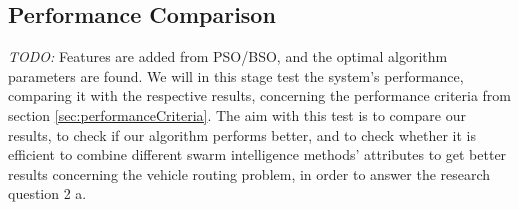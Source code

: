 \subsection{Performance Comparison}
\emph{\color{blue}TODO:} Features are added from PSO/BSO, and the optimal algorithm parameters are found. We will in this stage test the system's performance, comparing it with the respective results, concerning the performance criteria from section \vref{sec:performanceCriteria}. %
The aim with this test is to compare our results, to check if our algorithm performs better, and to check whether it is efficient to combine different swarm intelligence methods' attributes to get better results concerning the vehicle routing problem, in order to answer the research question 2 a.





